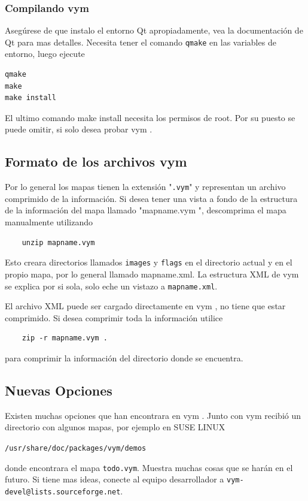 \documentclass{article}
\newcommand{\vym}{{\sc vym }}
\begin{document}
\begin{appendix}
\subsubsection{Compilando \vym}
Aseg\'urese de que instalo el entorno Qt apropiadamente, vea la documentaci\'on de Qt para mas detalles. Necesita tener el comando {\tt qmake} en las variables de entorno, luego ejecute

\begin{verbatim}
qmake
make  
make install
\end{verbatim}
El ultimo comando make install necesita los permisos de root. Por su puesto se puede omitir, si solo desea probar \vym.


\subsection{Formato de los archivos \vym } \label{fileformat}
Por lo general los mapas tienen la extensi\'on "{\tt .vym}" y representan un archivo comprimido de la informaci\'on. Si desea tener una vista a fondo de la estructura de la informaci\'on del mapa llamado "mapname.\vym", descomprima el mapa manualmente utilizando
\begin{verbatim}
	unzip mapname.vym
\end{verbatim}
Esto creara directorios llamados {\tt images} y {\tt flags} en el directorio actual y en el propio mapa, por lo general llamado mapname.xml. La estructura XML de \vym se explica por si sola, solo eche un vistazo a {\tt mapname.xml}.

El archivo XML puede ser cargado directamente en \vym, no tiene que estar comprimido. Si desea comprimir toda la informaci\'on utilice
\begin{verbatim}
	zip -r mapname.vym .
\end{verbatim}
para comprimir la informaci\'on del directorio donde se encuentra.

\subsection{Nuevas Opciones}
Existen muchas opciones que han encontrara en \vym. Junto con \vym recibi\'o un directorio con algunos mapas, por ejemplo en SUSE LINUX 
\begin{center}
	{\tt /usr/share/doc/packages/vym/demos}
\end{center}
donde encontrara el mapa {\tt todo.vym}. Muestra muchas cosas que se har\'an en el futuro. Si tiene mas ideas, conecte al equipo desarrollador a 
{\tt vym-devel@lists.sourceforge.net}.



\end{appendix}
\end{document}

